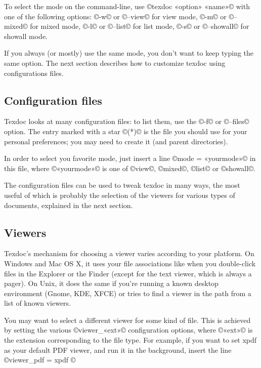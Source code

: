 \documentclass[a4paper, oneside]{scrartcl}
\begin{document}
To select the mode on the command-line, use ©texdoc «option» «name»© with one
of the following options: ©-w© or ©--view© for view mode, ©-m© or ©--mixed©
for mixed mode, ©-l© or ©--list© for list mode, ©-s© or ©--showall© for
showall mode.

If you always (or mostly) use the same mode, you don't want to keep typing the
same option. The next section describes how to customize texdoc using
configurations files.

\subsection{Configuration files}\label{ss-quick-file}

Texdoc looks at many configuration files: to list them, use the ©-f© or
©--files© option. The entry marked with a star ©(*)© is the file you should
use for your personal preferences; you may need to create it (and parent
directories).

In order to select you favorite mode, just insert a line ©mode = «yourmode»©
in this file, where ©«yourmode»© is one of ©view©, ©mixed©, ©list© or
©showall©.

The configuration files can be used to tweak texdoc in many ways, the most
useful of which is probably the selection of the viewers for various types of
documents, explained in the next section.

\subsection{Viewers}\label{ss-viewer}

Texdoc's mechanism for choosing a viewer varies according to your platform.
On Windows and Mac OS X, it uses your file associations like when you
double-click files in the Explorer or the Finder (except for the text viewer,
which is always a pager). On Unix, it does the same if you're running a known
desktop environment (Gnome, KDE, XFCE) or tries to find a viewer in the path
from a list of known viewers.

You may want to select a different viewer for some kind of file. This is
achieved by setting the various ©viewer_«ext»© configuration options, where
©«ext»© is the extension corresponding to the file type. For example, if you
want to set xpdf as your default PDF viewer, and run it in the background,
insert the line ©viewer_pdf = xpdf %
©%
\end{document}
